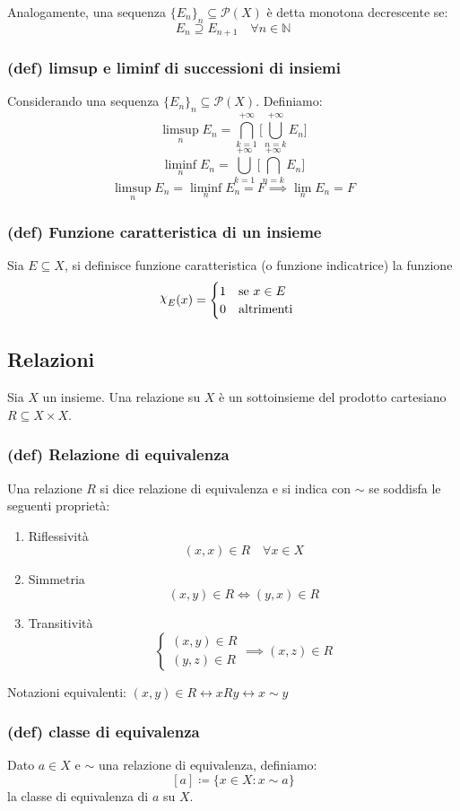 Analogamente, una sequenza $ \{E_n\}_n\subseteq \mathcal P(X)$ è detta monotona decrescente se:
$$E_{n}\supseteq E_{n+1} \quad \forall n \in \mathbb N$$


\subsubsection{(def) limsup e liminf di successioni di insiemi}
Considerando una sequenza $\{E_n\}_n\subseteq \mathcal P(X)$. Definiamo:
$$\limsup_n E_n = \bigcap_{k=1}^{+\infty}\Big [\bigcup_{n=k}^{+\infty} E_n\Big ]$$
$$\liminf_n E_n = \bigcup_{k=1}^{+\infty}\Big [\bigcap_{n=k}^{+\infty} E_n\Big ]$$
$$\limsup_n E_n=\liminf_n E_n=F \implies \lim_nE_n=F$$
\subsubsection{(def) Funzione caratteristica di un insieme}
Sia $E\subseteq X$, si definisce funzione caratteristica (o funzione indicatrice) la funzione $$\rchi_E(x)=\begin{cases}1\quad \text{se }x\in E\\0\quad\text{altrimenti}\end{cases}$$

\subsection{Relazioni}
Sia $X$ un insieme. Una relazione su $X$ è un sottoinsieme del prodotto cartesiano $R\subseteq X\times X$.
\subsubsection{(def) Relazione di equivalenza}
Una relazione $R$ si dice relazione di equivalenza e si indica con $\sim$ se soddisfa le seguenti proprietà:
\begin{enumerate}[label=\roman*]
    \item Riflessività $$(x,x)\in R\quad \forall x\in X$$
    \item Simmetria $$(x,y)\in R \iff (y,x)\in R$$
    \item Transitività $$\begin{cases}(x,y)\in R\\(y,z)\in R\end{cases}\implies (x,z)\in R$$
\end{enumerate}
Notazioni equivalenti: $(x,y)\in R \leftrightarrow xRy \leftrightarrow x\sim y$
\subsubsection{(def) classe di equivalenza}
Dato $a\in X$ e $\sim $ una relazione di equivalenza, definiamo:
$$[a]\coloneqq \{x\in X: x\sim a\}$$
la classe di equivalenza di $a$ su $X$.
